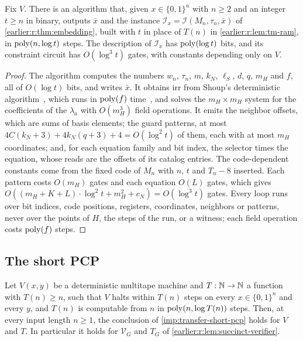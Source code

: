 \begin{lemma}[Generator]\label{earlier:r:lem:generator}
Fix \(V\). There is an algorithm that, given \(x\in\{0,1\}^n\) with
\(n\ge2\) and an integer \(t\ge n\) in binary, outputs \(\bar x\) and
the instance \(\mathcal I_x=\mathcal I(M_n,\tau_n,\bar x)\) of
\cref{earlier:r:thm:embedding}, built with \(t\) in place of \(T(n)\) in
\cref{earlier:r:lem:tm-ram}, in \(\operatorname{poly}(n,\log t)\) steps. The description of
\(\mathcal I_x\) has \(\operatorname{poly}(\log t)\) bits, and its constraint circuit
has \(O(\log^3t)\) gates, with constants depending only on \(V\).
\end{lemma}
\begin{proof}
The algorithm computes the numbers \(w_n\), \(\tau_n\), \(m\), \(k_N\),
\(\ell_S\), \(d\), \(q\), \(m_H\) and \(f\), all of \(O(\log t)\) bits, and
writes \(\bar x\). It obtains \(\mathrm{irr}\) from Shoup's deterministic
algorithm~\cite[Corollary~3.2]{Sho88}, which runs in \(\operatorname{poly}(f)\)
time~\cite[Algorithm~17]{BCGT13}, and solves the \(m_H\times m_H\) system
for the coefficients of the \(\lambda_a\) with \(O(m_H^3)\) field
operations. It emits the neighbor offsets, which are sums of basis
elements; the guard patterns, at most
\(4C(k_N+3)+4k_N(q+3)+4=O(\log^2t)\) of them, each with at most \(m_H\)
coordinates; and, for each equation family and bit index, the selector
times the equation, whose reads are the offsets of its catalog
entries. The code-dependent constants come from the fixed code of
\(M_n\) with \(n\), \(t\) and \(T_n-8\) inserted. Each pattern costs
\(O(m_H)\) gates and each equation \(O(L)\) gates, which gives
\(O((m_H+K+L)\cdot\log^2t+m_H^2+c_N)=O(\log^3t)\) gates. Every loop
runs over bit indices, code positions, registers, coordinates, neighbors
or patterns, never over the points of \(H\), the steps of the run, or a
witness; each field operation costs \(\operatorname{poly}(f)\) steps.
\end{proof}

\subsection{The short PCP}

\begin{theorem}
\label{earlier:r:thm:short-pcp-ours}
Let \(V(x,y)\) be a deterministic multitape machine and \(T:\mathbb N\to\mathbb N\) a
function with \(T(n)\ge n\), such that \(V\) halts within \(T(n)\) steps
on every \(x\in\{0,1\}^n\) and every \(y\), and \(T(n)\) is computable
from \(n\) in \(\operatorname{poly}(n,\log T(n))\) steps. Then, at every input length \(n\ge1\), the conclusion of
\cref{imp:transfer-short-pcp} holds for \(V\) and \(T\). In particular it holds
for \(\mathcal V_G\) and \(T_G\) of \cref{earlier:r:lem:succinct-verifier}.
\end{theorem}

